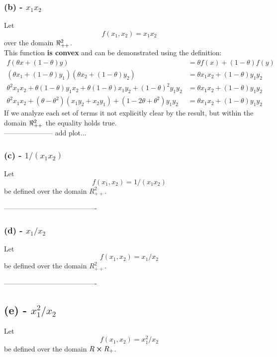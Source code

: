 \documentclass[letter]{article}
\begin{document}
\subsubsection{(b) - $x_1 x_2$}
Let $$f(x_1,x_2) = x_1 x_2$$ over the domain $\real_{++}^2$.\\
This function \textbf{is convex} and can be demonstrated using the definition:
\begin{align}
	f(\theta x + (1-\theta)y) &= \theta f(x) + (1-\theta) f(y)\\
	 (\theta x_1 + (1-\theta) y_1) (\theta x_2 + (1-\theta) y_2)&= \theta x_1 x_2 + (1- \theta) y_1 y_2\nonumber\\
	\theta^2 x_1 x_2 + \theta(1-\theta)y_1 x_2 + \theta (1-\theta) x_1 y_2 + (1-\theta)^2 y_1 y_2 &= \theta x_1 x_2 + (1- \theta) y_1 y_2\nonumber\\
	\theta^2 x_1 x_2 + (\theta-\theta^2) (x_1 y_2 + x_2 y_1) + (1- 2 \theta + \theta^2) y_1 y_2 &= \theta x_1 x_2 + (1- \theta) y_1 y_2
\end{align}
If we analyze each set of terms it not explicitly clear by the result, but within the domain $\real_{++}^2$ the equality holds true.\\
--------------------- add plot...

\subsubsection{(c) - $1/(x_1 x_2)$}
Let $$f(x_1,x_2) = 1/(x_1 x_2)$$ be defined over the domain $R_{++}^2$.






----------------------------------------


\subsubsection{(d) - $x_1/x_2$}
Let $$f(x_1,x_2) = x_1/x_2$$ be defined over the domain $R_{++}^2$.




----------------------------------------

\subsection{(e) - $x_1^2 / x_2$}
Let $$f(x_1,x_2) = x_1^2 / x_2$$ be defined over the domain $R \cross R_{+}$.
\end{document}
